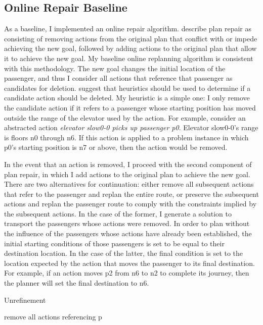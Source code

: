 \subsection{Online Repair Baseline} As a baseline, I implemented an online repair algorithm.  \cite{krogt05planrepair} describe plan repair as consisting of removing actions from the original plan that conflict with or impede achieving the new goal, followed by adding actions to the original plan that allow it to achieve the new goal.  My baseline online replanning algorithm is consistent with this methodology.  The new goal changes the initial location of the passenger, and thus I consider all actions that reference that passenger as candidates for deletion.  \citeauthor{krogt05planrepair} suggest that heuristics should be used to determine if a candidate action should be deleted.  My  heuristic is a simple one: I only remove the candidate action if it refers to a passenger whose starting position has moved outside the range of the elevator used by  the action.  For example, consider an abstracted action \textit{elevator slow0-0 picks up passenger p0}. Elevator slow0-0's range is floors n0 through n6. If this action is applied to a problem instance in which p0's starting position is n7 or above, then the action would be removed.

In the event that an action is removed, I proceed with the second component of plan repair, in which I add actions to the original plan to achieve the new goal.  There are two alternatives for continuation:  either remove all subsequent actions that refer to the passenger and replan the entire route, or preserve the subsequent actions and replan the passenger route to comply with the constraints implied by the subsequent actions.  In the case of the former, I generate a solution to transport the passengers whose actions were removed.  In order to plan without the influence of the passengers whose actions have already been established, the initial starting conditions of those passengers is set to be equal to their destination location.  In the case of the latter, the final condition is set to the location expected by the action that moves the passenger to its final destination.  For example, if an action moves p2 from n6 to n2 to complete its journey, then the planner will set the final destination to n6.


\begin{algorithm}
\caption{Unrefinement}
\label{alg:p}

\begin{algorithmic}[1] 
  
      \State remove all actions referencing p
    \EndIf
  \EndFor

\end{algorithmic}
\end{algorithm}


